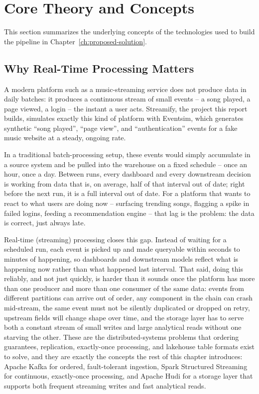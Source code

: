 \section{Core Theory and Concepts}
\label{sec:core-theory}

This section summarizes the underlying concepts of the technologies used to build the pipeline in Chapter~\ref{ch:proposed-solution}.

\subsection{Why Real-Time Processing Matters}

A modern platform such as a music-streaming service does not produce data in daily batches: it produces a continuous stream of small events -- a song played, a page viewed, a login -- the instant a user acts. Streamify, the project this report builds, simulates exactly this kind of platform with Eventsim, which generates synthetic ``song played'', ``page view'', and ``authentication'' events for a fake music website at a steady, ongoing rate.

In a traditional batch-processing setup, these events would simply accumulate in a source system and be pulled into the warehouse on a fixed schedule -- once an hour, once a day. Between runs, every dashboard and every downstream decision is working from data that is, on average, half of that interval out of date; right before the next run, it is a full interval out of date. For a platform that wants to react to what users are doing now -- surfacing trending songs, flagging a spike in failed logins, feeding a recommendation engine -- that lag is the problem: the data is correct, just always late.

Real-time (streaming) processing closes this gap. Instead of waiting for a scheduled run, each event is picked up and made queryable within seconds to minutes of happening, so dashboards and downstream models reflect what is happening now rather than what happened last interval. That said, doing this reliably, and not just quickly, is harder than it sounds once the platform has more than one producer and more than one consumer of the same data: events from different partitions can arrive out of order, any component in the chain can crash mid-stream, the same event must not be silently duplicated or dropped on retry, upstream fields will change shape over time, and the storage layer has to serve both a constant stream of small writes and large analytical reads without one starving the other. These are the distributed-systems problems that ordering guarantees, replication, exactly-once processing, and lakehouse table formats exist to solve, and they are exactly the concepts the rest of this chapter introduces: Apache Kafka for ordered, fault-tolerant ingestion, Spark Structured Streaming for continuous, exactly-once processing, and Apache Hudi for a storage layer that supports both frequent streaming writes and fast analytical reads.

